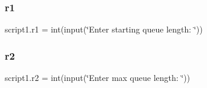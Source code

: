 \mbox{\label{namespacescript1_a99facd43021956db8051e98b1af4c986}} 
\subsubsection{\texorpdfstring{r1}{r1}}
{\footnotesize\ttfamily script1.\+r1 = int(input(\char`\"{}Enter starting queue length\+: \char`\"{}))}

\mbox{\label{namespacescript1_a81541689805d977e0b536a11d038009e}} 
\subsubsection{\texorpdfstring{r2}{r2}}
{\footnotesize\ttfamily script1.\+r2 = int(input(\char`\"{}Enter max queue length\+: \char`\"{}))}

